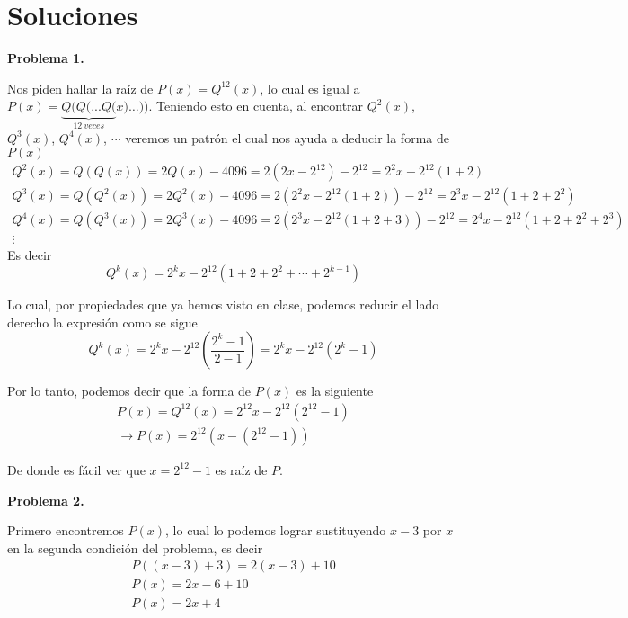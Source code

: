 \newpage
\section*{\large Soluciones}

    \textbf{Problema 1.}

Nos piden hallar la raíz de $P(x) = Q^{12}(x)$, lo cual es igual a $P(x) = \underbrace{Q(Q(...Q(}_{12\ veces}x)\dots))$.
Teniendo esto en cuenta, al encontrar $Q^{2}(x)$, $Q^{3}(x)$, $Q^{4}(x)$, $\cdots$ veremos un patrón el cual nos ayuda a deducir la forma de $P(x)$
\begin{gather*}
    Q^{2}(x) = Q(Q(x)) = 2 Q(x) - 4096 = 2(2x - 2^{12}) - 2^{12} = \boxed{2^2 x - 2^{12} (1 + 2)} \\
    Q^{3}(x) = Q(Q^2(x)) = 2 Q^2(x) - 4096 = 2(2^2 x - 2^{12} (1 + 2)) - 2^{12} = \boxed{2^3 x - 2^{12} (1 + 2 + 2^2)}\\
    Q^{4}(x) = Q(Q^3(x)) = 2 Q^3(x) - 4096 = 2\left(2^3 x - 2^{12} (1 + 2 + 3)\right) - 2^{12} = \boxed{2^4 x - 2^{12} (1 + 2 + 2^2 + 2^3)}\\
    \vdots
\end{gather*}
Es decir
\[\boxed{Q^{k}(x) = 2^k x - 2^{12} (1 + 2 + 2^2 + \cdots + 2^{k-1})}\]

Lo cual, por propiedades que ya hemos visto en clase, podemos reducir el lado derecho la expresión como se sigue
\[Q^{k}(x) = 2^k x - 2^{12} \left(\frac{2^k - 1}{2 - 1}\right) = \boxed{2^k x - 2^{12}(2^k - 1)}\]

Por lo tanto, podemos decir que la forma de $P(x)$ es la siguiente
\begin{gather*}
    P(x) = Q^{12}(x) = 2^{12} x - 2^{12}\left(2^{12} - 1\right)\\
    \longrightarrow P(x) = 2^{12} \left(x - (2^{12} - 1)\right)
\end{gather*}

De donde es fácil ver que $\boxed{x = 2^{12} - 1}$ es raíz de $P$.



\textbf{Problema 2.}

Primero encontremos $P(x)$, lo cual lo podemos lograr sustituyendo $x - 3$ por $x$ en la segunda condición del problema, es decir
\begin{gather*}
    P\left((x - 3) + 3\right) = 2(x - 3) + 10\\
    P(x) = 2x - 6 + 10\\
    P(x) = 2x + 4\\
\end{gather*}

